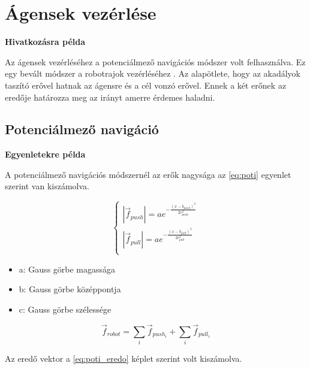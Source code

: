 \section{Ágensek vezérlése}

\textbf{Hivatkozásra példa}

Az ágensek vezérléséhez a potenciálmező navigációs módszer volt felhasználva. Ez egy bevált módszer a robotrajok vezérléséhez \cite{szanto2015investigation}. Az alapötlete, hogy az akadályok taszító erővel hatnak az ágensre és a cél vonzó erővel. Ennek a két erőnek az eredője határozza meg az irányt amerre érdemes haladni.

\subsection{Potenciálmező navigáció}

\textbf{Egyenletekre példa}

A potenciálmező navigációs módszernél az erők nagysága az \eqref{eq:poti} egyenlet szerint van kiszámolva.

\begin{equation}
    \left\{
    \begin{array}{l}
        |\vec{f}_{push}| = a e ^ {- \frac{(x - b_{push}) ^ {2}}{2 c_{push}^2 }} \\
        |\vec{f}_{pull}| = a e ^ {- \frac{(x - b_{pull}) ^ {2}}{2 c_{pull}^2 }} \\
    \end{array}
    \right.
    \label{eq:poti}
\end{equation}

\begin{itemize}
    \item a: Gauss görbe magassága
    \item b: Gauss görbe középpontja
    \item c: Gauss görbe szélessége
\end{itemize}

\begin{equation}
    \vec{f}_{robot} = \sum_{i} \vec{f}_{push_{i}} + \sum_{i} \vec{f}_{pull_{i}}
    \label{eq:poti_eredo}
\end{equation}

Az eredő vektor a \eqref{eq:poti_eredo} képlet szerint volt kiszámolva. 
